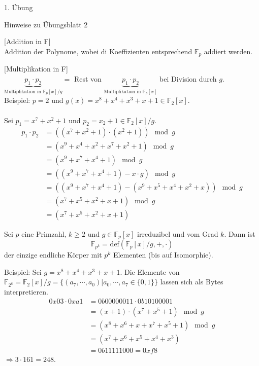 \begin{section}{1. Übung}
\begin{subsection}{Hinweise zu Übungsblatt 2}
\begin{enumerate}
    \begin{satz}{[Addition in F]} \\
      Addition der Polynome, wobei di Koeffizienten entsprechend $\mathbb{F}_p$ addiert werden. 
    \end{satz}
    \begin{satz}{[Multiplikation in F]} \\
      $\underbrace{p_1 \cdot p_2}_{\text{Multiplikation in }\mathbb{F}_p[x]/g} = $ Rest von $\underbrace{p_1 \cdot p_2}_{\text{Multiplikation in }\mathbb{F}_p[x]} $ bei Division durch $g$. \\
      Beispiel: $p = 2$ und $g(x) = x^8+x^4+x^3+x+1 \in \mathbb{F}_2[x]$. \\ \\
      Sei $p_1 = x^7+x^2+1$ und $p_2 = x_2 +1 \in \mathbb{F}_2[x]/g$.
      \begin{align*}
       p_1 \cdot p_2 & = ((x^7+x^2+1)\cdot(x^2+1)) \mod g \\
       & = (x^9+x^4+x^2+x^7+x^2+1) \mod g \\
       & = (x^9+x^7+x^4+1)  \mod g\\
       & = ((x^9+x^7+x^4+1) -x\cdot g ) \mod g\\
       & = ((x^9+x^7+x^4+1)-(x^9+x^5+x^4+x^2+x)) \mod g \\
       & = (x^7+x^5+x^2+x+1) \mod g \\
       & = (x^7+x^5+x^2+x+1)
      \end{align*}
    \end{satz}

    \begin{satz}
     Sei $p$ eine Primzahl, $k \geq 2$ und $g \in \mathbb{F}_p[x]$ irreduzibel und vom Grad $k$. Dann ist
     \[\mathbb{F}_{p^k} =_{}\text{def} (\mathbb{F}_p[x]/g, +, \cdot)\]
     der einzige endliche Körper mit $p^k$ Elementen (bis auf Isomorphie).
    \end{satz}
    
    Beispiel: Sei $g = x^8+x^4+x^3+x+1$. Die Elemente von $\mathbb{F}_{2^8} = \mathbb{F}_2[x]/g = \{(a_7, \cdots, a_0) | a_0,\cdots , a_7 \in \{0,1\}\}$ lassen sich als Bytes interpretieren.
    \begin{align*}
     0x03 \cdot 0xa1 & = 0b00000011 \cdot 0b10100001 \\
     & = (x+1) \cdot (x^7+x^5+1) \mod g \\
     & = (x^8+x^6+x+x^7+x^5+1)  \mod g \\
     & = (x^7+x^6+x^5+x^4+x^3) \\
     & = 0b11111000 = 0xf8
    \end{align*}
    $\Rightarrow 3 \cdot 161 = 248$.
   \end{enumerate}
  \end{subsection}
\end{section}
